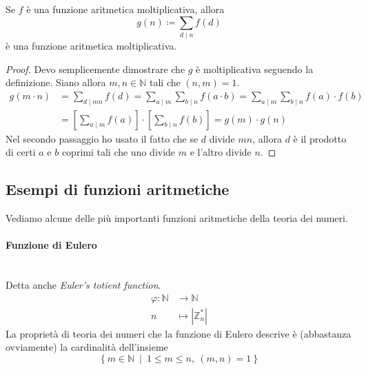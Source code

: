 \begin{proposizione}
	\label{somma_moltiplicativa}
	Se $f$ è una funzione aritmetica moltiplicativa, allora 
	\begin{equation*}
	g(n)\coloneqq \sum_{d\mid n}f(d)
	\end{equation*}
	è una funzione aritmetica moltiplicativa.
\end{proposizione}
\begin{proof}
	Devo semplicemente dimostrare che $g$ è moltiplicativa seguendo la definizione. Siano allora $m,n \in \mathbb{N}$ tali che $(n,m)=1$.
	\begin{align*}
	g(m \cdot n)&=\sum_{d\mid mn}f(d)=\sum_{a\mid m}\sum_{b\mid n}f(a\cdot b)=\sum_{a\mid m}\sum_{b\mid n}f(a)\cdot f(b) \\
	&=\left[\sum_{a\mid m}f(a)\right]\cdot\left[\sum_{b\mid n}f(b)\right]=g(m)\cdot g(n)
	\end{align*}
	Nel secondo passaggio ho usato il fatto che se $d$ divide $mn$, allora $d$ è il prodotto di certi $a$ e $b$ coprimi tali che uno divide $m$ e l'altro divide $n$.
\end{proof}




\subsection{Esempi di funzioni aritmetiche}
Vediamo alcune delle più importanti funzioni aritmetiche della teoria dei numeri.
\paragraph{Funzione di Eulero} \ \\ Detta anche \textit{Euler's totient function}.
\begin{align*}
\varphi: \mathbb{N}&\longrightarrow \mathbb{N}\\
n &\longmapsto |\mathbb{Z}_n^*|
\end{align*}
La proprietà di teoria dei numeri che la funzione di Eulero descrive è (abbastanza ovviamente) la cardinalità dell'insieme
\begin{equation*}
\left\{m\in\mathbb{N} \ \middle| \ 1\leq m \leq n, \ (m,n)=1\right\}
\end{equation*}
